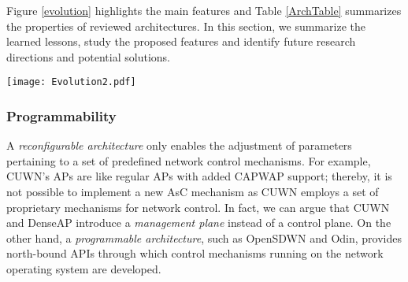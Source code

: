 Figure \ref{evolution} highlights the main features and Table \ref{ArchTable} summarizes the properties of reviewed architectures.
In this section, we summarize the learned lessons, study the proposed features and identify future research directions and potential solutions.
%
%
\begin{figure*}[!t]
	\centering
	\texttt{[image: Evolution2.pdf]}
	\caption{This figure summarizes the main features of SDWLAN architectures based on the categorization presented in Section \ref{Archs}.}
	\label{evolution}
\end{figure*}
%
%




\subsubsection{\textbf{Programmability}}
\label{arch-program}
A \textit{reconfigurable architecture} only enables the adjustment of parameters pertaining to a set of predefined network control mechanisms. 
For example, CUWN's APs are like regular APs with added CAPWAP support; thereby, it is not possible to implement a new AsC mechanism as CUWN employs a set of proprietary mechanisms for network control.
In fact, we can argue that CUWN and DenseAP introduce a \textit{management plane} instead of a control plane.
On the other hand, a \textit{programmable architecture}, such as OpenSDWN and Odin, provides north-bound APIs through which control mechanisms running on the network operating system are developed.




